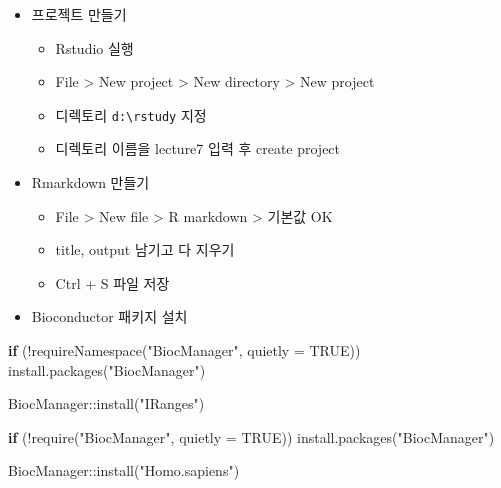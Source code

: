 \documentclass[
]{book}
\newenvironment{Shaded}{\begin{snugshade}}{\end{snugshade}}
\newcommand{\AttributeTok}[1]{\textcolor[rgb]{0.77,0.63,0.00}{#1}}
\newcommand{\ConstantTok}[1]{\textcolor[rgb]{0.00,0.00,0.00}{#1}}
\newcommand{\ControlFlowTok}[1]{\textcolor[rgb]{0.13,0.29,0.53}{\textbf{#1}}}
\newcommand{\FunctionTok}[1]{\textcolor[rgb]{0.00,0.00,0.00}{#1}}
\newcommand{\NormalTok}[1]{#1}
\newcommand{\SpecialCharTok}[1]{\textcolor[rgb]{0.00,0.00,0.00}{#1}}
\newcommand{\StringTok}[1]{\textcolor[rgb]{0.31,0.60,0.02}{#1}}
\providecommand{\tightlist}{%
  \setlength{\itemsep}{0pt}\setlength{\parskip}{0pt}}
\begin{document}
\begin{itemize}
\tightlist
\item
  프로젝트 만들기

  \begin{itemize}
  \tightlist
  \item
    Rstudio 실행
  \item
    File \textgreater{} New project \textgreater{} New directory \textgreater{} New project
  \item
    디렉토리 \texttt{d:\textbackslash{}rstudy} 지정
  \item
    디렉토리 이름을 lecture7 입력 후 create project
  \end{itemize}
\item
  Rmarkdown 만들기

  \begin{itemize}
  \tightlist
  \item
    File \textgreater{} New file \textgreater{} R markdown \textgreater{} 기본값 OK
  \item
    title, output 남기고 다 지우기
  \item
    Ctrl + S 파일 저장
  \end{itemize}
\item
  Bioconductor 패키지 설치
\end{itemize}

\begin{Shaded}
\begin{Highlighting}[]
\ControlFlowTok{if}\NormalTok{ (}\SpecialCharTok{!}\FunctionTok{requireNamespace}\NormalTok{(}\StringTok{"BiocManager"}\NormalTok{, }\AttributeTok{quietly =} \ConstantTok{TRUE}\NormalTok{))}
    \FunctionTok{install.packages}\NormalTok{(}\StringTok{"BiocManager"}\NormalTok{)}

\NormalTok{BiocManager}\SpecialCharTok{::}\FunctionTok{install}\NormalTok{(}\StringTok{"IRanges"}\NormalTok{)}
\end{Highlighting}
\end{Shaded}

\begin{Shaded}
\begin{Highlighting}[]
\ControlFlowTok{if}\NormalTok{ (}\SpecialCharTok{!}\FunctionTok{require}\NormalTok{(}\StringTok{"BiocManager"}\NormalTok{, }\AttributeTok{quietly =} \ConstantTok{TRUE}\NormalTok{))}
    \FunctionTok{install.packages}\NormalTok{(}\StringTok{"BiocManager"}\NormalTok{)}

\NormalTok{BiocManager}\SpecialCharTok{::}\FunctionTok{install}\NormalTok{(}\StringTok{"Homo.sapiens"}\NormalTok{)}
\end{Highlighting}
\end{Shaded}
\end{document}
